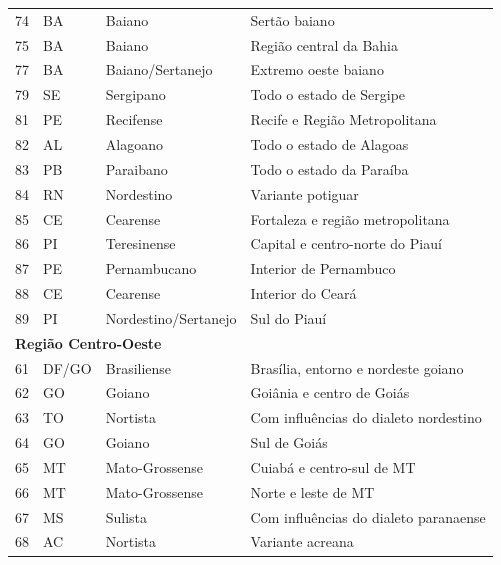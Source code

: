 \begin{table}[ht]
\begin{tabular}{llll}
    74 & BA & Baiano                  & Sertão baiano                            \\
    75 & BA & Baiano                  & Região central da Bahia                  \\
    77 & BA & Baiano/Sertanejo        & Extremo oeste baiano                     \\
    79 & SE & Sergipano               & Todo o estado de Sergipe                 \\
    81 & PE & Recifense               & Recife e Região Metropolitana            \\
    82 & AL & Alagoano                & Todo o estado de Alagoas                 \\
    83 & PB & Paraibano               & Todo o estado da Paraíba                 \\
    84 & RN & Nordestino              & Variante potiguar                        \\
    85 & CE & Cearense                & Fortaleza e região metropolitana         \\
    86 & PI & Teresinense             & Capital e centro-norte do Piauí          \\
    87 & PE & Pernambucano            & Interior de Pernambuco                   \\
    88 & CE & Cearense                & Interior do Ceará                        \\
    89 & PI & Nordestino/Sertanejo    & Sul do Piauí                             \\
    \midrule
    \multicolumn{4}{l}{\textbf{Região Centro-Oeste}} \\ 
    61 & DF/GO & Brasiliense       & Brasília, entorno e nordeste goiano   \\
    62 & GO    & Goiano            & Goiânia e centro de Goiás             \\
    63 & TO    & Nortista          & Com influências do dialeto nordestino \\
    64 & GO    & Goiano            & Sul de Goiás                          \\
    65 & MT    & Mato-Grossense    & Cuiabá e centro-sul de MT             \\
    66 & MT    & Mato-Grossense    & Norte e leste de MT                   \\
    67 & MS    & Sulista           & Com influências do dialeto paranaense \\
    68 & AC    & Nortista          & Variante acreana                      \\

\end{tabular}
\end{table}
